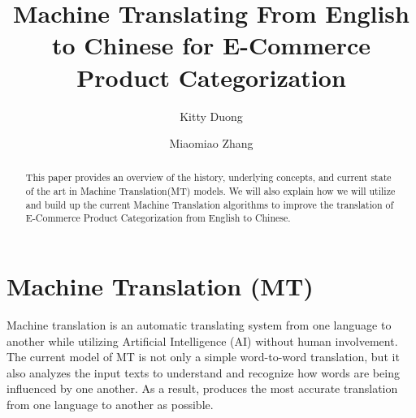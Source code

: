 \documentclass[sigconf]{acmart}
\begin{document}
\title{Machine Translating From English to Chinese for E-Commerce Product Categorization}
\author{Kitty Duong}

\author{Miaomiao Zhang}

\begin{abstract}
    This paper provides an overview of the history, underlying concepts, and current state of the art in Machine Translation(MT) models. We will also explain how we will utilize and build up the current Machine Translation algorithms to improve the translation of E-Commerce Product Categorization from English to Chinese.
\end{abstract}
\maketitle

\section{Machine Translation (MT)} %
    Machine translation is an automatic translating system from one language to another while utilizing Artificial Intelligence (AI) without human involvement. The current model of MT is not only a simple word-to-word translation, but it also analyzes the input texts to understand and recognize how words are being influenced by one another. As a result, produces the most accurate translation from one language to another as possible\cite{Amazon_MT}.
    
\end{document}
